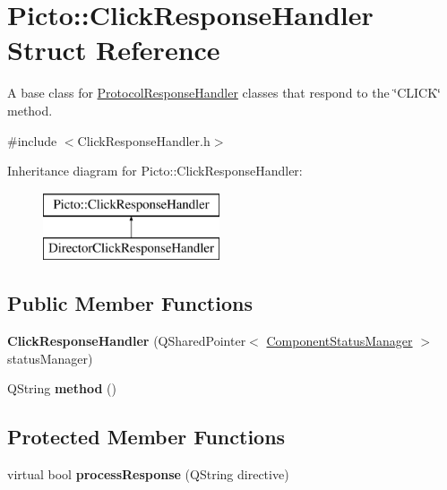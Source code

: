 \hypertarget{struct_picto_1_1_click_response_handler}{\section{Picto\-:\-:Click\-Response\-Handler Struct Reference}
\label{struct_picto_1_1_click_response_handler}
}


A base class for \hyperlink{struct_picto_1_1_protocol_response_handler}{Protocol\-Response\-Handler} classes that respond to the \char`\"{}\-C\-L\-I\-C\-K\char`\"{} method.  




{\ttfamily \#include $<$Click\-Response\-Handler.\-h$>$}

Inheritance diagram for Picto\-:\-:Click\-Response\-Handler\-:\begin{figure}[H]
\begin{center}
\leavevmode
\includegraphics[height=2.000000cm]{struct_picto_1_1_click_response_handler}
\end{center}
\end{figure}
\subsection*{Public Member Functions}
\begin{DoxyCompactItemize}
\item 
\hypertarget{struct_picto_1_1_click_response_handler_a48acf028754463ff8be21e2e9274c106}{{\bfseries Click\-Response\-Handler} (Q\-Shared\-Pointer$<$ \hyperlink{class_component_status_manager}{Component\-Status\-Manager} $>$ status\-Manager)}\label{struct_picto_1_1_click_response_handler_a48acf028754463ff8be21e2e9274c106}

\item 
\hypertarget{struct_picto_1_1_click_response_handler_a02bf3b36c6161ad9efec05b1468952cd}{Q\-String {\bfseries method} ()}\label{struct_picto_1_1_click_response_handler_a02bf3b36c6161ad9efec05b1468952cd}

\end{DoxyCompactItemize}
\subsection*{Protected Member Functions}
\begin{DoxyCompactItemize}
\item 
\hypertarget{struct_picto_1_1_click_response_handler_aaaf361e4fb054b91ae35efc322fa65f2}{virtual bool {\bfseries process\-Response} (Q\-String directive)}\label{struct_picto_1_1_click_response_handler_aaaf361e4fb054b91ae35efc322fa65f2}

\end{DoxyCompactItemize}


